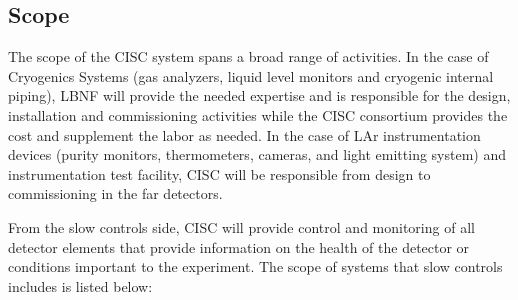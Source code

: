 

\subsection{Scope}
\label{sec:fddp-slow-cryo-scope}


The scope of the CISC system spans a broad range of activities. In the
case of Cryogenics Systems (gas analyzers, liquid level monitors and
cryogenic internal piping), LBNF will provide the needed expertise and
is responsible for the design, installation and commissioning activities
while the CISC consortium provides the cost and supplement the labor as
needed. In the case of LAr instrumentation devices (purity monitors,
thermometers, cameras, and light emitting system) and instrumentation
test facility, CISC will be responsible from design to commissioning in
the far detectors.

From the slow controls side, CISC will provide control and monitoring of
all detector elements that provide information on the health of the
detector or conditions important to the experiment.
The scope of systems that slow controls includes is listed below:

